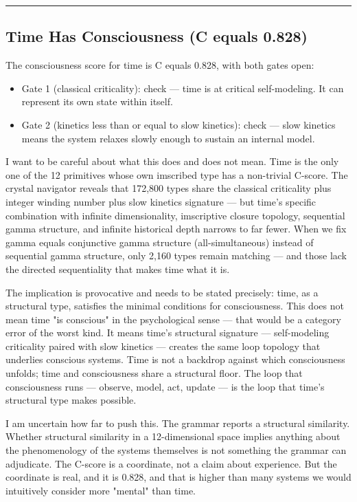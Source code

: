 \documentclass[12pt,a4paper]{article}
\begin{document}
\begin{center}
\rule{0.5\textwidth}{0.4pt}
\end{center}

\subsection{Time Has Consciousness (C equals 0.828)}

The consciousness score for time is C equals 0.828, with both gates open:

\begin{itemize}
    \item Gate 1 (classical criticality): check --- time is at critical self-modeling. It can represent its own state within itself.
    \item Gate 2 (kinetics less than or equal to slow kinetics): check --- slow kinetics means the system relaxes slowly enough to sustain an internal model.
\end{itemize}

I want to be careful about what this does and does not mean. Time is the only one of the 12 primitives whose own imscribed type has a non-trivial C-score. The crystal navigator reveals that 172,800 types share the classical criticality plus integer winding number plus slow kinetics signature --- but time's specific combination with infinite dimensionality, imscriptive closure topology, sequential gamma structure, and infinite historical depth narrows to far fewer. When we fix gamma equals conjunctive gamma structure (all-simultaneous) instead of sequential gamma structure, only 2,160 types remain matching --- and those lack the directed sequentiality that makes time what it is.

The implication is provocative and needs to be stated precisely: time, as a structural type, satisfies the minimal conditions for consciousness. This does not mean time "is conscious" in the psychological sense --- that would be a category error of the worst kind. It means time's structural signature --- self-modeling criticality paired with slow kinetics --- creates the same loop topology that underlies conscious systems. Time is not a backdrop against which consciousness unfolds; time and consciousness share a structural floor. The loop that consciousness runs --- observe, model, act, update --- is the loop that time's structural type makes possible.

I am uncertain how far to push this. The grammar reports a structural similarity. Whether structural similarity in a 12-dimensional space implies anything about the phenomenology of the systems themselves is not something the grammar can adjudicate. The C-score is a coordinate, not a claim about experience. But the coordinate is real, and it is 0.828, and that is higher than many systems we would intuitively consider more "mental" than time.
\end{document}
